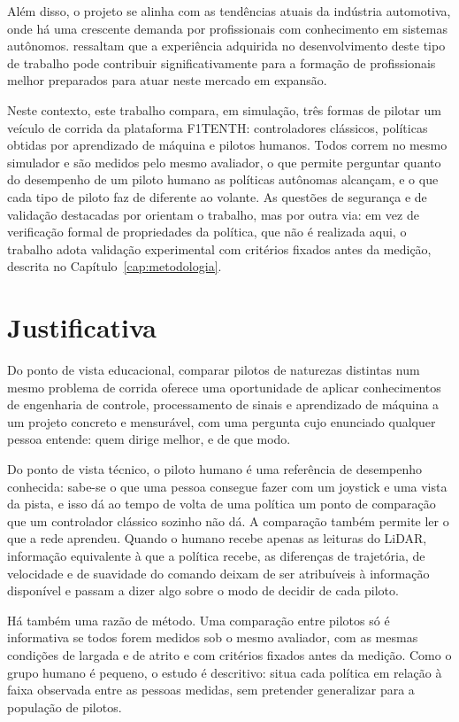 Além disso, o projeto se alinha com as tendências atuais da indústria
automotiva, onde há uma crescente demanda por profissionais com conhecimento em
sistemas autônomos. \cite{Stachowicz2023FastRLAP} ressaltam que a experiência
adquirida no desenvolvimento deste tipo de trabalho pode contribuir
significativamente para a formação de profissionais melhor preparados para
atuar neste mercado em expansão.

Neste contexto, este trabalho compara, em simulação, três formas de pilotar um
veículo de corrida da plataforma F1TENTH: controladores clássicos, políticas
obtidas por aprendizado de máquina e pilotos humanos. Todos correm no mesmo
simulador e são medidos pelo mesmo avaliador, o que permite perguntar quanto do
desempenho de um piloto humano as políticas autônomas alcançam, e o que cada
tipo de piloto faz de diferente ao volante. As questões de
segurança e de validação destacadas por \cite{Ivanov2020Verifying} orientam o
trabalho, mas por outra via: em vez de verificação formal de propriedades da
política, que não é realizada aqui, o trabalho adota validação experimental com
critérios fixados antes da medição, descrita no Capítulo~\ref{cap:metodologia}.

\section*{Justificativa}\label{sec:Justificativa}

Do ponto de vista educacional, comparar pilotos de naturezas distintas num
mesmo problema de corrida oferece uma oportunidade de aplicar conhecimentos de
engenharia de controle, processamento de sinais e aprendizado de máquina a um
projeto concreto e mensurável, com uma pergunta cujo enunciado qualquer pessoa
entende: quem dirige melhor, e de que modo.

Do ponto de vista técnico, o piloto humano é uma referência de desempenho
conhecida: sabe-se o que uma pessoa consegue fazer com um joystick e uma vista da
pista, e isso dá ao tempo de volta de uma política um ponto de comparação que
um controlador clássico sozinho não dá. A comparação também permite ler o que a
rede aprendeu. Quando o humano recebe apenas as leituras do LiDAR, informação
equivalente à que a política recebe, as diferenças de trajetória, de velocidade e de suavidade do
comando deixam de ser atribuíveis à informação disponível e passam a dizer algo
sobre o modo de decidir de cada piloto.

Há também uma razão de método. Uma comparação entre pilotos só é informativa se
todos forem medidos sob o mesmo avaliador, com as mesmas condições de largada e de
atrito e com critérios fixados antes da medição. Como o grupo humano é pequeno,
o estudo é descritivo: situa cada política em relação à faixa observada entre as
pessoas medidas, sem pretender generalizar para a população de pilotos.

